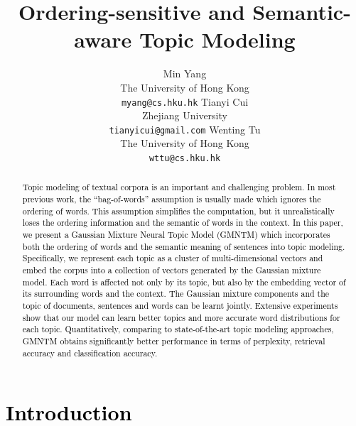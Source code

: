\documentclass[english,letter]{article}
\renewcommand\[{\begin{equation}}
\renewcommand\]{\end{equation}}
\begin{document}
\title{Ordering-sensitive and Semantic-aware Topic Modeling}


\author{Min Yang \\ The University of Hong Kong \\ {\tt myang@cs.hku.hk} \And Tianyi Cui \\ Zhejiang University \\ {\tt tianyicui@gmail.com} \And Wenting Tu \\ The University of Hong Kong \\ {\tt wttu@cs.hku.hk}}
\maketitle
\begin{abstract}
\textcolor{black}{Topic modeling of textual corpora is an important
and challenging problem. In most previous work, the ``bag-of-words''
assumption is usually made which ignores the ordering of words. This
assumption simplifies the computation, but it unrealistically loses
the ordering information and the semantic of words in the context.
In this paper, we present a Gaussian Mixture Neural Topic Model (GMNTM)
which incorporates both the ordering of words and the semantic meaning
of sentences into topic modeling. Specifically, we represent each
topic as a cluster of multi-dimensional vectors and embed the corpus
into a collection of vectors generated by the Gaussian mixture model.
Each word is affected not only by its topic, but also by the embedding
vector of its surrounding words and the context. The Gaussian mixture
components and the topic of documents, sentences and words can be
learnt jointly. Extensive experiments show that our model can learn
better topics and more accurate word distributions for each topic.
Quantitatively, comparing to state-of-the-art topic modeling approaches,
GMNTM obtains significantly better performance in terms of perplexity,
retrieval accuracy and classification accuracy. }
\end{abstract}

\section{\textcolor{black}{Introduction }}
\end{document}
